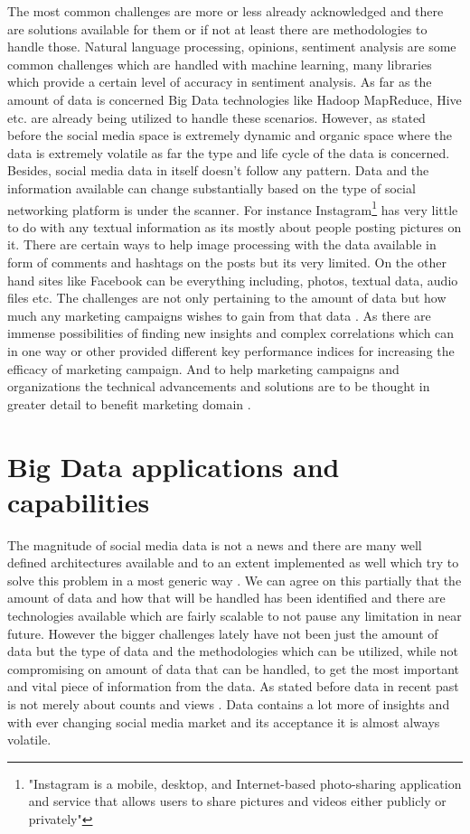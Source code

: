 \documentclass[sigconf]{acmart}
\begin{document}
The most common challenges are more or less already acknowledged and there are solutions available for them or if not at least there are methodologies to handle those. Natural language processing, opinions, sentiment analysis are some common challenges which are handled with machine learning, many libraries which provide a certain level of accuracy in sentiment analysis. As far as the amount of data is concerned Big Data technologies like Hadoop MapReduce, Hive etc. are already being utilized to handle these scenarios. However, as stated before the social media space is extremely dynamic and organic space where the data is extremely volatile as far the type and life cycle of the data is concerned.  Besides, social media data in itself doesn't follow any pattern. Data and the information available can change substantially based on the type of social networking platform is under the scanner. For instance Instagram\footnote{"Instagram is a mobile, desktop, and Internet-based photo-sharing application and service that allows users to share pictures and videos either publicly or privately"} has very little to do with any textual information as its mostly about people posting pictures on it. There are certain ways to help image processing with the data available in form of comments and hashtags on the posts but its very limited. On the other hand sites like Facebook can be everything including, photos, textual data, audio files etc. The challenges are not only pertaining to the amount of data but how much any marketing campaigns wishes to gain from that data \cite{HOFACKER201673}. As there are immense possibilities of finding new insights and complex correlations which can in one way or other provided different key performance indices for increasing the efficacy of marketing campaign. And to help marketing campaigns and organizations the technical advancements and solutions are to be thought in greater detail to benefit marketing domain \cite{AMADO2017}.

\section{Big Data applications and capabilities}
The magnitude of social media data is not a news and there are many well defined architectures available and to an extent implemented as well which try to solve this problem in a most generic way \cite{Olshannikova2017}. We can agree on this partially that the amount of data and how that will be handled has been identified and there are technologies available which are fairly scalable to not pause any limitation in near future. However the bigger challenges lately have not been just the amount of data but the type of data and the methodologies which can be utilized, while not compromising on amount of data that can be handled, to get the most important and vital piece of information from the data. As stated before data in recent past is not merely about counts and views \cite{mylynnfelt}. Data contains a lot more of insights and with ever changing social media market and its acceptance it is almost always volatile.
\end{document}
